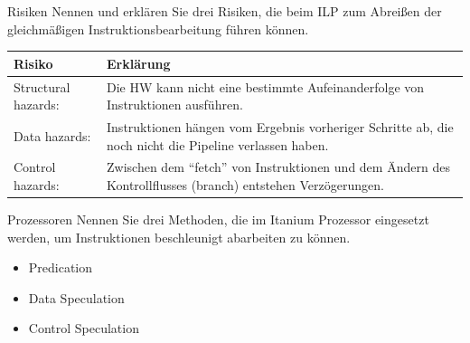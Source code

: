 \begin{aufgabe}[Parallelität]{Risiken}
  Nennen und erklären Sie drei Risiken,
  die beim ILP zum Abreißen der gleichmäßigen Instruktionsbearbeitung führen können.
  \tcblower
  \begin{tabularx}{\textwidth}{|l|X|}
    \toprule
    Risiko              & Erklärung                                                                                                           \\
    \midrule
    Structural hazards: & Die HW kann nicht eine bestimmte Aufeinanderfolge von Instruktionen ausführen.                                      \\
    \midrule
    Data hazards:       & Instruktionen hängen vom Ergebnis vorheriger Schritte ab,
    die noch nicht die Pipeline verlassen haben.                                                                                              \\
    \midrule
    Control hazards:    & Zwischen dem \enquote{fetch} von Instruktionen und dem Ändern des Kontrollflusses (branch) entstehen Verzögerungen. \\
    \bottomrule
  \end{tabularx}
\end{aufgabe}

\begin{aufgabe}{Prozessoren}
  Nennen Sie drei Methoden,
  die im Itanium Prozessor eingesetzt werden,
  um Instruktionen beschleunigt abarbeiten zu können.
  \tcblower
  \begin{itemize}
    \item Predication
    \item Data Speculation
    \item Control Speculation
  \end{itemize}
\end{aufgabe}